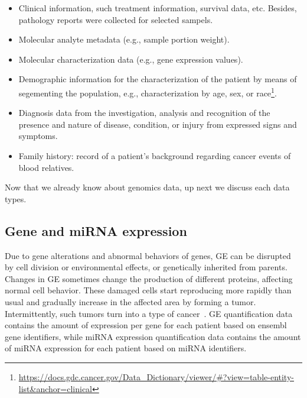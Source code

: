 \begin{itemize}[noitemsep]
    \item Clinical information, such treatment information, survival data, etc. Besides, pathology reports were collected for selected sampels. 
    \item Molecular analyte metadata (e.g., sample portion weight).
    \item Molecular characterization data (e.g., gene expression values).
    \item Demographic information for the characterization of the patient by means of segementing the population, e.g., characterization by age, sex, or race\footnote{\url{https://docs.gdc.cancer.gov/Data_Dictionary/viewer/\#?view=table-entity-list&anchor=clinical}}.
    \item Diagnosis data from the investigation, analysis and recognition of the presence and nature of disease, condition, or injury from expressed signs and symptoms. 
    \item Family history: record of a patient's background regarding cancer events of blood relatives.
\end{itemize}

Now that we already know about genomics data, up next we discuss each data types. 


\subsection{Gene and miRNA expression}
Due to  gene alterations and abnormal behaviors of genes, GE can be disrupted by cell division or environmental effects, or genetically inherited from parents. Changes in GE sometimes change the production of different proteins, affecting normal cell behavior. These damaged cells start reproducing more rapidly than usual and gradually increase in the affected area by forming a tumor. Intermittently, such tumors turn into a type of cancer~\cite{zuo2019identification,24Podolsky}. GE quantification data contains the amount of expression per gene for each patient based on ensembl gene identifiers, while miRNA expression quantification data contains the amount of miRNA expression for each patient based on miRNA identifiers.

